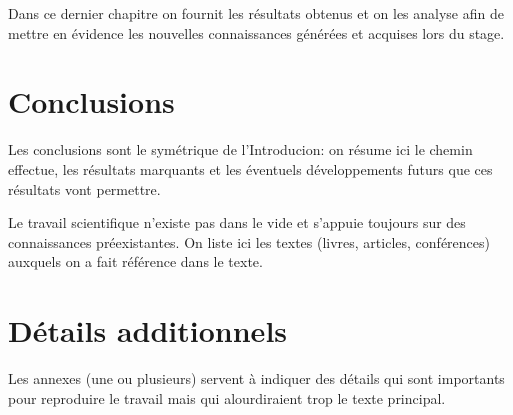 \documentclass[11pt,a4paper]{report}
\begin{document}
Dans ce dernier chapitre on fournit les résultats obtenus et on les
analyse afin de mettre en évidence les nouvelles connaissances
générées et acquises lors du stage.



\chapter*{Conclusions}

Les conclusions sont le symétrique de l'Introducion: on résume ici le
chemin effectue, les résultats marquants et les éventuels
développements futurs que ces résultats vont permettre.


\clearpage
{}



Le travail scientifique n'existe pas dans le vide et s'appuie toujours
sur des connaissances préexistantes.  On liste ici les textes (livres,
articles, conférences) auxquels on a fait référence dans le texte.



\appendix
\chapter{Détails additionnels}

Les annexes (une ou plusieurs) servent à indiquer des détails qui
sont importants pour reproduire le travail mais qui alourdiraient trop
le texte principal.
\end{document}
